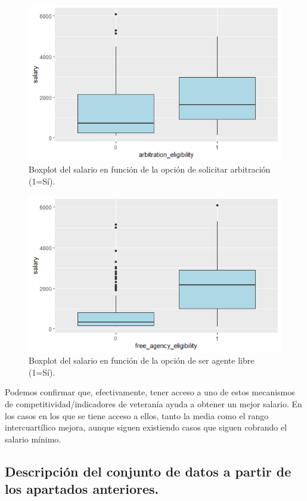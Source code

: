 \documentclass[a4paper,12pt, oneside]{book}
\begin{document}
\begin{figure}[H]
\centering
\includegraphics[scale=0.7]{images/arbitration_salary.png}
\caption{Boxplot del salario en función de la opción de solicitar arbitración (1=Sí).}
\label{boxplotarbitration}
\end{figure}

\begin{figure}[H]
\centering
\includegraphics[scale=0.7]{images/agency_salary.png}
\caption{Boxplot del salario en función de la opción de ser agente libre (1=Sí).}
\label{boxplotarbitration}
\end{figure}

Podemos confirmar que, efectivamente, tener acceso a uno de estos mecanismos de competitividad/indicadores de veteranía ayuda a obtener un mejor salario. En los casos en los que se tiene acceso a ellos, tanto la media como el rango intercuartílico mejora, aunque siguen existiendo casos que siguen cobrando el salario mínimo.

\subsection{Descripción del conjunto de datos a partir de los apartados anteriores.}
\end{document}
